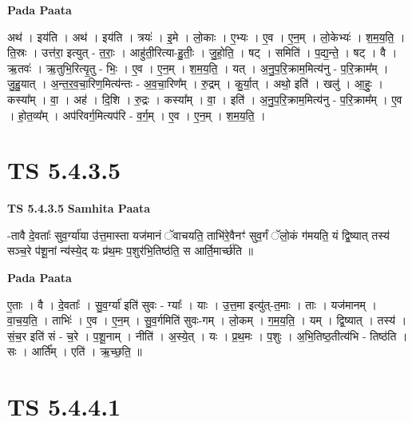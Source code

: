 \documentclass[17pt]{extarticle}
\begin{document}
\textbf{Pada Paata} \newline

अथ॑ । इय॑ति । अथ॑ । इय॑ति । त्रयः॑ । इ॒मे । लो॒काः । ए॒भ्यः । ए॒व । ए॒न॒म् । लो॒केभ्यः॑ । श॒म॒य॒ति॒ । ति॒स्रः । उत्त॑रा॒ इत्युत् - त॒राः॒ । आहु॑ती॒रित्या-हु॒तीः॒ । जु॒हो॒ति॒ । षट् । समिति॑ । प॒द्य॒न्ते॒ । षट् । वै । ऋ॒तवः॑ । ऋ॒तुभि॒रित्यृ॒तु - भिः॒ । ए॒व । ए॒न॒म् । श॒म॒य॒ति॒ । यत् । अ॒नु॒प॒रि॒क्राम॒मित्य॑नु - प॒रि॒क्राम᳚म् । जु॒हु॒यात् । अ॒न्त॒र॒व॒चा॒रिण॒मित्य॑न्तः - अ॒व॒चा॒रिण᳚म् । रु॒द्रम् । कु॒र्या॒त् । अथो॒ इति॑ । खलु॑ । आ॒हुः॒ । कस्या᳚म् । वा॒ । अह॑ । दि॒शि । रु॒द्रः । कस्या᳚म् । वा॒ । इति॑ । अ॒नु॒प॒रि॒क्राम॒मित्य॑नु - प॒रि॒क्राम᳚म् । ए॒व । हो॒त॒व्य᳚म् । अप॑रिवर्ग॒मित्यप॑रि - व॒र्ग॒म् । ए॒व । ए॒न॒म् । श॒म॒य॒ति॒ ।  \newline





\section{ TS 5.4.3.5 }

\textbf{TS 5.4.3.5 } \newline
\textbf{Samhita Paata} \newline

-तावै दे॒वताः᳚ सुव॒र्ग्या॑या उ॑त्त॒मास्ता यज॑मानं ॅवाचयति॒ ताभि॑रे॒वैनꣳ॑ सुव॒र्गं ॅलो॒कं ग॑मयति॒ यं द्वि॒ष्यात् तस्य॑ सञ्च॒रे प॑शू॒नां न्य॑स्ये॒द् यः प्र॑थ॒मः प॒शुर॑भि॒तिष्ठ॑ति॒ स आर्ति॒मार्च्छ॑ति ॥ \newline

\textbf{Pada Paata} \newline

ए॒ताः । वै । दे॒वताः᳚ । सु॒व॒र्ग्या॑ इति॑ सुवः - ग्याः᳚ । याः । उ॒त्त॒मा इत्यु॑त्-त॒माः । ताः । यज॑मानम् । वा॒च॒य॒ति॒ । ताभिः॑ । ए॒व । ए॒न॒म् । सु॒व॒र्गमिति॑ सुवः-गम् । लो॒कम् । ग॒म॒य॒ति॒ । यम् । द्वि॒ष्यात् । तस्य॑ । सं॒च॒र इति॑ सं - च॒रे । प॒शू॒नाम् । नीति॑ । अ॒स्ये॒त् । यः । प्र॒थ॒मः । प॒शुः । अ॒भि॒तिष्ठ॒तीत्य॑भि - तिष्ठ॑ति । सः । आर्ति᳚म् । एति॑ । ऋ॒च्छ॒ति॒ ॥  \newline





\section{ TS 5.4.4.1 }
\end{document}
